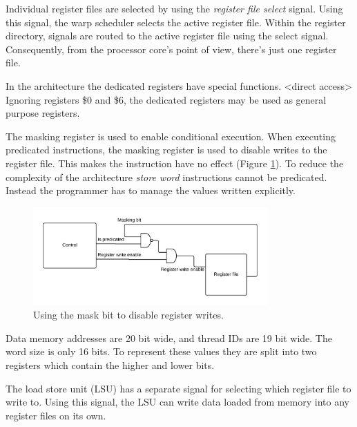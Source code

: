 Individual register files are selected by using the \emph{register file select} signal.
Using this signal, the warp scheduler selects the active register file.
Within the register directory, signals are routed to the active register file using the select signal.
Consequently, from the processor core's point of view, there's just one register file.

In the architecture the dedicated registers have special functions.
<direct access>
Ignoring registers \$0 and \$6, the dedicated registers may be used as general purpose registers.


The masking register is used to enable conditional execution.
When executing predicated instructions, the masking register is used to disable writes to the register file.
This makes the instruction have no effect (Figure \ref{fig:masking}).
To reduce the complexity of the architecture \emph{store word} instructions cannot be predicated.
Instead the programmer has to manage the values written explicitly.
\begin{figure}[H]
	\centering
	\includegraphics[width=0.8\textwidth]{../gpu/diagrams/masking.png}
	\caption{Using the mask bit to disable register writes.}
	\label{fig:masking}
\end{figure}

Data memory addresses are 20 bit wide, and thread IDs are 19 bit wide.
The word size is only 16 bits.
To represent these values they are split into two registers which contain the higher and lower bits.

The load store unit (LSU) has a separate signal for selecting which register file to write to.
Using this signal, the LSU can write data loaded from memory into any register files on its own.
